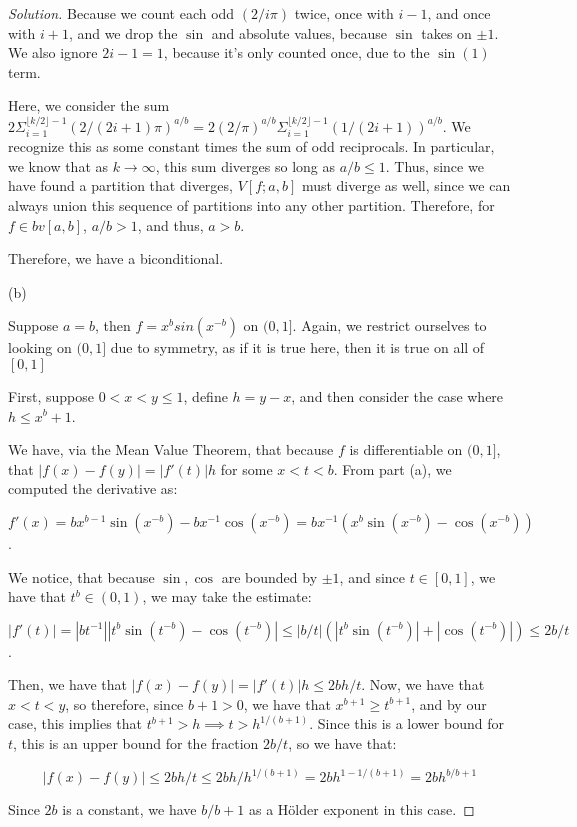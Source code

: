 \documentclass[10pt]{article}
\begin{document}
\begin{proof}[Solution]
Because we count each odd $ (2/i\pi)$ twice, once with $i-1$, and once with $i + 1$, and we drop the $\sin$ and absolute values, because $\sin$ takes on $\pm 1$. We also ignore $2i - 1 = 1$, because it's only counted once, due to the $\sin(1)$ term.

Here, we consider the sum $2\Sigma_{i=1}^{\lfloor k/2 \rfloor -1} (2/(2i+1)\pi)^{a/b} = 2(2/\pi)^{a/b} \Sigma_{i=1}^{\lfloor k/2 \rfloor -1} (1/(2i + 1))^{a/b}$. We recognize this as some constant times the sum of odd reciprocals. In particular, we know that as $k \to \infty$, this sum diverges so long as $a/b \leq 1$. Thus, since we have found a partition that diverges, $V[f;a,b]$ must diverge as well, since we can always union this sequence of partitions into any other partition. Therefore, for $f \in bv[a,b]$, $a/b > 1$, and thus, $a > b$.

Therefore, we have a biconditional.

(b)

Suppose $a = b$, then $f = x^b sin(x^{-b})$ on $(0,1]$. Again, we restrict ourselves to looking on $(0,1]$ due to symmetry, as if it is true here, then it is true on all of $[0,1]$

First, suppose $0 < x < y \leq 1$, define $h = y - x$, and then consider the case where $h \leq x^b+1$.

We have, via the Mean Value Theorem, that because $f$ is differentiable on $(0,1]$, that $|f(x) - f(y)| = |f'(t)|h$ for some $x < t < b$. From part (a), we computed the derivative as:

$$ f'(x) = bx^{b-1} \sin(x^{-b}) - b x^{-1} \cos(x^{-b}) = bx^{-1}(  x^{b}\sin(x^{-b}) - \cos(x^{-b})) $$.

We notice, that because $\sin,\cos$ are bounded by $\pm1$, and since $ t \in [0,1]$, we have that $t^b \in (0,1)$, we may take the estimate:

$$ |f'(t)| =   |bt^{-1}|| t^{b}\sin(t^{-b}) - \cos(t^{-b})| \leq |b/t|(| t^b \sin(t^{-b}) | + | \cos(t^{-b})|) \leq 2b/t $$.

Then, we have that $|f(x) - f(y)| = |f'(t)|h \leq 2bh/t$. Now, we have that $x < t < y$, so therefore, since $b+1 > 0$, we have that $x^{b+1} \geq t^{b+1}$, and by our case, this implies that $t^{b+1} > h \implies  t> h^{1/(b+1)}$. Since this is a lower bound for $t$, this is an upper bound for the fraction $2b/t$, so we have that:

$$ |f(x) - f(y)| \leq 2bh/t \leq   2bh/h^{1/(b+1)} = 2b h^{1 - 1/(b+1)}= 2b h^{b /b+1} $$

Since $2b$ is a constant, we have $b/b+1$ as a H\"older exponent in this case.


\end{proof}
\end{document}
